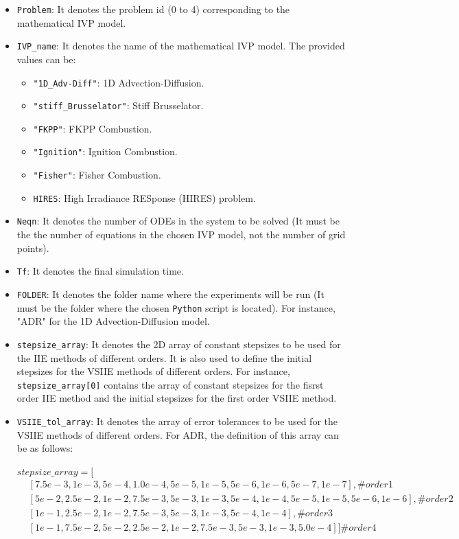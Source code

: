 \documentclass[preprint,1p]{article}
\begin{document}
\begin{itemize}
\item {\tt Problem}: It denotes the problem id (0 to 4) corresponding to the mathematical IVP model.
\item {\tt IVP\_name}: It denotes the name of the mathematical IVP model. The provided values can be:
	    \begin{itemize}
		    \item {\tt "1D\_Adv-Diff"}: 1D Advection-Diffusion.	
		    \item {\tt "stiff\_Brusselator"}: Stiff Brusselator.
		    \item {\tt "FKPP"}: FKPP Combustion.		
		    \item {\tt "Ignition"}: Ignition Combustion.
		    \item {\tt "Fisher"}: Fisher Combustion.
		    \item {\tt HIRES}: High Irradiance RESponse (HIRES) problem.
		\end{itemize}
\item {\tt Neqn}: It denotes the number of ODEs in the system to be solved 
  (It must be the the number of equations in the chosen IVP model, not the number of grid points).

\item {\tt Tf}: It denotes the final simulation time.

\item {\tt FOLDER}: It denotes the folder name where the experiments will be run 
  (It must be the folder where the chosen \texttt{Python} script is located). For instance, "ADR" for the 1D Advection-Diffusion model.

\item {\tt stepsize\_array}: It denotes the 2D array of constant stepsizes to be used for the IIE methods of different orders. 
It is also used to define the initial stepsizes for the VSIIE methods of different orders.
For instance, {\tt stepsize\_array[0]} contains the array of constant stepsizes for the fisrst order IIE method and the initial 
stepsizes for the first order VSIIE method.

\item {\tt VSIIE\_tol\_array}: It denotes the array of error tolerances to be used for the VSIIE methods of different orders.
For ADR, the definition of this array can be as follows: 



\begin{small}
$stepsize\_array=[$
\begin{align*}
& [7.5e-3, 1e-3, 5e-4, 1.0e-4, 5e-5, 1e-5, 5e-6, 1e-6, 5e-7, 1e-7], \#order 1\\
& [5e-2, 2.5e-2, 1e-2, 7.5e-3, 5e-3, 1e-3, 5e-4, 1e-4, 5e-5, 1e-5, 5e-6, 1e-6],  \#order 2\\
& [1e-1, 2.5e-2, 1e-2, 7.5e-3, 5e-3, 1e-3, 5e-4, 1e-4],  \#order 3\\
& [1e-1, 7.5e-2, 5e-2, 2.5e-2, 1e-2, 7.5e-3, 5e-3, 1e-3, 5.0e-4]]   \#order 4	
\end{align*}
\end{small}



\end{itemize}
\end{document}
